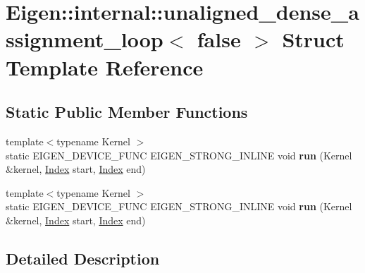 \hypertarget{struct_eigen_1_1internal_1_1unaligned__dense__assignment__loop_3_01false_01_4}{}\section{Eigen\+:\+:internal\+:\+:unaligned\+\_\+dense\+\_\+assignment\+\_\+loop$<$ false $>$ Struct Template Reference}
\label{struct_eigen_1_1internal_1_1unaligned__dense__assignment__loop_3_01false_01_4}
\subsection*{Static Public Member Functions}
\begin{DoxyCompactItemize}
\item 
\mbox{\label{struct_eigen_1_1internal_1_1unaligned__dense__assignment__loop_3_01false_01_4_a1a8b25a9d174f08fc57cb22dc5503f89}} 
{\footnotesize template$<$typename Kernel $>$ }\\static E\+I\+G\+E\+N\+\_\+\+D\+E\+V\+I\+C\+E\+\_\+\+F\+U\+NC E\+I\+G\+E\+N\+\_\+\+S\+T\+R\+O\+N\+G\+\_\+\+I\+N\+L\+I\+NE void {\bfseries run} (Kernel \&kernel, \hyperlink{namespace_eigen_a62e77e0933482dafde8fe197d9a2cfde}{Index} start, \hyperlink{namespace_eigen_a62e77e0933482dafde8fe197d9a2cfde}{Index} end)
\item 
\mbox{\label{struct_eigen_1_1internal_1_1unaligned__dense__assignment__loop_3_01false_01_4_a1a8b25a9d174f08fc57cb22dc5503f89}} 
{\footnotesize template$<$typename Kernel $>$ }\\static E\+I\+G\+E\+N\+\_\+\+D\+E\+V\+I\+C\+E\+\_\+\+F\+U\+NC E\+I\+G\+E\+N\+\_\+\+S\+T\+R\+O\+N\+G\+\_\+\+I\+N\+L\+I\+NE void {\bfseries run} (Kernel \&kernel, \hyperlink{namespace_eigen_a62e77e0933482dafde8fe197d9a2cfde}{Index} start, \hyperlink{namespace_eigen_a62e77e0933482dafde8fe197d9a2cfde}{Index} end)
\end{DoxyCompactItemize}


\subsection{Detailed Description}
